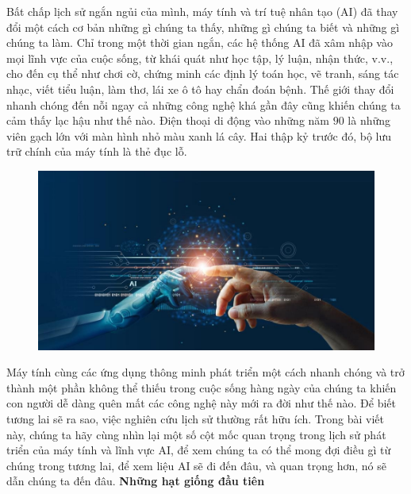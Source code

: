 \begin{multicols}{2}
	Bất chấp lịch sử ngắn ngủi của mình, máy tính và trí tuệ nhân tạo (AI) đã thay đổi một cách cơ bản những gì chúng ta thấy, những gì chúng ta biết và những gì chúng ta làm. Chỉ trong một thời gian ngắn, các hệ thống AI đã xâm nhập vào mọi lĩnh vực của cuộc sống, từ khái quát như học tập, lý luận, nhận thức, v.v., cho đến cụ thể như chơi cờ, chứng minh các định lý toán học, vẽ tranh, sáng tác nhạc, viết tiểu luận, làm thơ, lái xe ô tô hay chẩn đoán bệnh. Thế giới thay đổi nhanh chóng đến nỗi ngay cả những công nghệ khá gần đây cũng khiến chúng ta cảm thấy lạc hậu như thế nào. Điện thoại di động vào những năm $90$ là những viên gạch lớn với màn hình nhỏ màu xanh lá cây. Hai thập kỷ trước đó, bộ lưu trữ chính của máy tính là thẻ đục lỗ.
	\begin{figure}[H]
		\vspace*{-5pt}
		\centering
		\captionsetup{labelformat= empty, justification=centering}
		\includegraphics[width= 1\linewidth]{AI1.jpg}
		\vspace*{-15pt}
	\end{figure}
	Máy tính cùng các ứng dụng thông minh phát triển một cách nhanh chóng và trở thành một phần không thể thiếu trong cuộc sống hàng ngày của chúng ta khiến con người dễ dàng quên mất các công nghệ này mới ra đời như thế nào. Để biết tương lai sẽ ra sao, việc nghiên cứu lịch sử thường rất hữu ích. Trong bài viết này, chúng ta hãy cùng nhìn lại một số cột mốc quan trọng trong lịch sử phát triển của máy tính và lĩnh vực AI, để xem chúng ta có thể mong đợi điều gì từ chúng trong tương lai, để xem liệu AI sẽ đi đến đâu, và quan trọng hơn, nó sẽ dẫn chúng ta đến đâu.
	\vskip 0.1cm
	\textbf{\color{cackithi}Những hạt giống đầu tiên}
	\vskip 0.1cm

\end{multicols}
